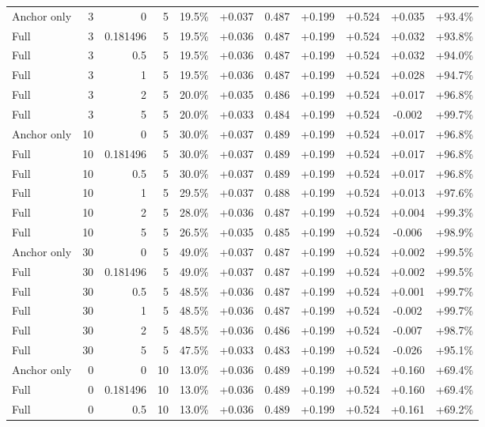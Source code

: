 \begin{table}[htbp]
\begin{tabular}{lrrrccccccc}
Anchor only & 3 & 0 & 5 & 19.5\% & +0.037 & 0.487 & +0.199 & +0.524 & +0.035 & +93.4\% \\
Full & 3 & 0.181496 & 5 & 19.5\% & +0.036 & 0.487 & +0.199 & +0.524 & +0.032 & +93.8\% \\
Full & 3 & 0.5 & 5 & 19.5\% & +0.036 & 0.487 & +0.199 & +0.524 & +0.032 & +94.0\% \\
Full & 3 & 1 & 5 & 19.5\% & +0.036 & 0.487 & +0.199 & +0.524 & +0.028 & +94.7\% \\
Full & 3 & 2 & 5 & 20.0\% & +0.035 & 0.486 & +0.199 & +0.524 & +0.017 & +96.8\% \\
Full & 3 & 5 & 5 & 20.0\% & +0.033 & 0.484 & +0.199 & +0.524 & -0.002 & +99.7\% \\
Anchor only & 10 & 0 & 5 & 30.0\% & +0.037 & 0.489 & +0.199 & +0.524 & +0.017 & +96.8\% \\
Full & 10 & 0.181496 & 5 & 30.0\% & +0.037 & 0.489 & +0.199 & +0.524 & +0.017 & +96.8\% \\
Full & 10 & 0.5 & 5 & 30.0\% & +0.037 & 0.489 & +0.199 & +0.524 & +0.017 & +96.8\% \\
Full & 10 & 1 & 5 & 29.5\% & +0.037 & 0.488 & +0.199 & +0.524 & +0.013 & +97.6\% \\
Full & 10 & 2 & 5 & 28.0\% & +0.036 & 0.487 & +0.199 & +0.524 & +0.004 & +99.3\% \\
Full & 10 & 5 & 5 & 26.5\% & +0.035 & 0.485 & +0.199 & +0.524 & -0.006 & +98.9\% \\
Anchor only & 30 & 0 & 5 & 49.0\% & +0.037 & 0.487 & +0.199 & +0.524 & +0.002 & +99.5\% \\
Full & 30 & 0.181496 & 5 & 49.0\% & +0.037 & 0.487 & +0.199 & +0.524 & +0.002 & +99.5\% \\
Full & 30 & 0.5 & 5 & 48.5\% & +0.036 & 0.487 & +0.199 & +0.524 & +0.001 & +99.7\% \\
Full & 30 & 1 & 5 & 48.5\% & +0.036 & 0.487 & +0.199 & +0.524 & -0.002 & +99.7\% \\
Full & 30 & 2 & 5 & 48.5\% & +0.036 & 0.486 & +0.199 & +0.524 & -0.007 & +98.7\% \\
Full & 30 & 5 & 5 & 47.5\% & +0.033 & 0.483 & +0.199 & +0.524 & -0.026 & +95.1\% \\
Anchor only & 0 & 0 & 10 & 13.0\% & +0.036 & 0.489 & +0.199 & +0.524 & +0.160 & +69.4\% \\
Full & 0 & 0.181496 & 10 & 13.0\% & +0.036 & 0.489 & +0.199 & +0.524 & +0.160 & +69.4\% \\
Full & 0 & 0.5 & 10 & 13.0\% & +0.036 & 0.489 & +0.199 & +0.524 & +0.161 & +69.2\% \\

\end{tabular}
\end{table}
